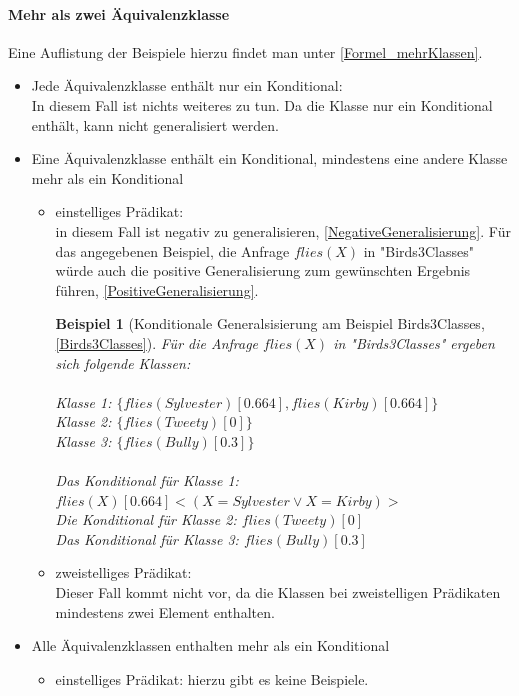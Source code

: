\documentclass[a4paper, 11pt]{book}
\newtheorem{Bsp}{Beispiel}[section]
\begin{document}
\paragraph{Mehr als zwei Äquivalenzklasse} 
Eine Auflistung der Beispiele hierzu findet man unter \ref{Formel_mehrKlassen}.
\begin{itemize}
	\item Jede Äquivalenzklasse enthält nur ein Konditional:\\
	In diesem Fall ist nichts weiteres zu tun. Da die Klasse nur ein Konditional enthält, kann nicht generalisiert werden.
	\item Eine Äquivalenzklasse enthält ein Konditional, mindestens eine andere Klasse mehr als ein Konditional
	\begin{itemize}
		\item einstelliges Prädikat:\\
		 in diesem Fall ist negativ zu generalisieren, \ref{NegativeGeneralisierung}. Für das angegebenen Beispiel, die Anfrage $ flies(X) $ in "{}Birds3Classes"{} würde auch die positive Generalisierung zum gewünschten Ergebnis führen, \ref{PositiveGeneralisierung}.
		\begin{Bsp}[Konditionale Generalsisierung am Beispiel Birds3Classes, \ref{Birds3Classes}]
			Für die Anfrage $ flies(X) $ in "{}Birds3Classes"{} ergeben sich folgende Klassen:\\
			\\
			Klasse 1: $ \{flies(Sylvester)[0.664], flies(Kirby)[0.664]\}  $\\
			Klasse 2: $ \{flies(Tweety)[0]\} $\\
			Klasse 3: $ \{flies(Bully)[0.3]\} $\\
			\\
			\noindent
			Das Konditional für Klasse 1: $ flies(X)[0.664]<(X = Sylvester \lor  X = Kirby)>$\\
			Die Konditional für Klasse 2: $ flies(Tweety)[0] $\\
			Das Konditional für Klasse 3: $ flies(Bully)[0.3] $
		\end{Bsp}
		\item zweistelliges Prädikat:\\	
		Dieser Fall kommt nicht vor, da die Klassen bei zweistelligen Prädikaten mindestens zwei Element enthalten.	
	\end{itemize}
	\item Alle Äquivalenzklassen enthalten mehr als ein Konditional
	\begin{itemize}
		\item einstelliges Prädikat: hierzu gibt es keine Beispiele.

\end{itemize}
\end{itemize}
\end{document}
